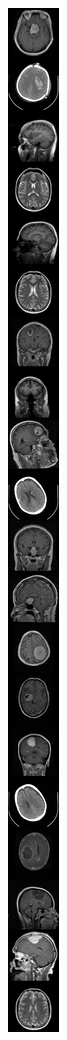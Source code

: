 \documentclass[conference]{IEEEtran}
\begin{document}
\begin{figure}[!htb]
	\centering
	\begin{subfigure}[b]{0.13\textwidth}
		\includegraphics[width=\textwidth]{Umbrales/Original.png}

\end{subfigure}
\end{figure}
\end{document}
